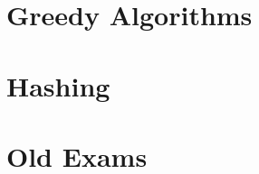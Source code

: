 \documentclass[11pt]{report}
\begin{document}
\begin{spacing}{1.2}
\chapter{Greedy Algorithms}
%



\chapter{Hashing}






\chapter{Old Exams}












\end{spacing}
\end{document}
